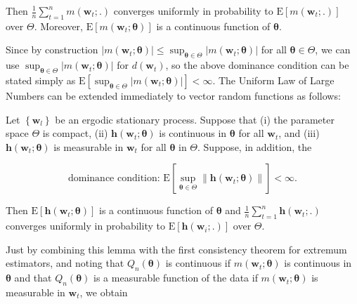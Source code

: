 \documentclass[10pt]{article}
\begin{document}
Then $\frac{1}{n} \sum_{t=1}^{n} m\left(\mathbf{w}_{t} ;.\right)$ converges uniformly in probability to $\mathrm{E}\left[m\left(\mathbf{w}_{t} ;.\right)\right]$ over $\Theta$. Moreover, $\mathrm{E}\left[m\left(\mathbf{w}_{t} ; \boldsymbol{\theta}\right)\right]$ is a continuous function of $\boldsymbol{\theta}$.

Since by construction $\left|m\left(\mathbf{w}_{t} ; \boldsymbol{\theta}\right)\right| \leq \sup _{\boldsymbol{\theta} \in \Theta}\left|m\left(\mathbf{w}_{t} ; \boldsymbol{\theta}\right)\right|$ for all $\boldsymbol{\theta} \in \Theta$, we can use $\sup _{\boldsymbol{\theta} \in \Theta}\left|m\left(\mathbf{w}_{t} ; \boldsymbol{\theta}\right)\right|$ for $d\left(\mathbf{w}_{t}\right)$, so the above dominance condition can be stated simply as $\mathrm{E}\left[\sup _{\boldsymbol{\theta} \in \Theta}\left|m\left(\mathbf{w}_{t} ; \boldsymbol{\theta}\right)\right|\right]<\infty$. The Uniform Law of Large Numbers can be extended immediately to vector random functions as follows:

Let $\left\{\mathbf{w}_{l}\right\}$ be an ergodic stationary process. Suppose that (i) the parameter space $\Theta$ is compact, (ii) $\mathbf{h}\left(\mathbf{w}_{t} ; \boldsymbol{\theta}\right)$ is continuous in $\boldsymbol{\theta}$ for all $\mathbf{w}_{t}$, and (iii) $\mathbf{h}\left(\mathbf{w}_{t} ; \boldsymbol{\theta}\right)$ is measurable in $\mathbf{w}_{t}$ for all $\boldsymbol{\theta}$ in $\Theta$. Suppose, in addition, the

$$
\text { dominance condition: } \mathrm{E}\left[\sup _{\boldsymbol{\theta} \in \Theta}\left\|\mathbf{h}\left(\mathbf{w}_{t} ; \boldsymbol{\theta}\right)\right\|\right]<\infty \text {. }
$$

Then $\mathrm{E}\left[\mathbf{h}\left(\mathbf{w}_{t} ; \boldsymbol{\theta}\right)\right]$ is a continuous function of $\boldsymbol{\theta}$ and $\frac{1}{n} \sum_{t=1}^{n} \mathbf{h}\left(\mathbf{w}_{t} ;.\right)$ converges uniformly in probability to $\mathrm{E}\left[\mathbf{h}\left(\mathbf{w}_{i} ;.\right)\right]$ over $\Theta$.

Just by combining this lemma with the first consistency theorem for extremum estimators, and noting that $Q_{n}(\boldsymbol{\theta})$ is continuous if $m\left(\mathbf{w}_{t} ; \boldsymbol{\theta}\right)$ is continuous in $\boldsymbol{\theta}$ and that $Q_{n}(\boldsymbol{\theta})$ is a measurable function of the data if $m\left(\mathbf{w}_{t} ; \boldsymbol{\theta}\right)$ is measurable in $\mathbf{w}_{t}$, we obtain
\end{document}
